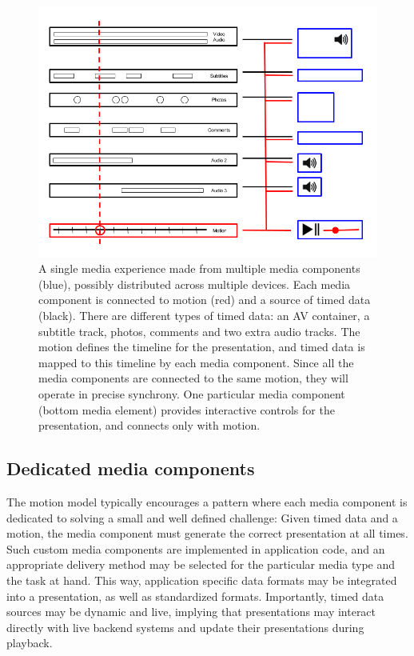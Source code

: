 \documentclass[graybox]{svmult}
\begin{document}
\begin{figure}[h]
\centering
\includegraphics[scale=.4]{fig/motion-media.png}
\caption{A single media experience made from multiple media components (blue), possibly distributed across multiple devices. Each media component is connected to motion (red) and a source of timed data (black). There are different types of timed data: an AV container, a subtitle track, photos, comments and two extra audio tracks. The motion defines the timeline for the presentation, and timed data is mapped to this timeline by each media component. Since all the media components are connected to the same motion, they will operate in precise synchrony. One particular media component (bottom media element) provides interactive controls for the presentation, and connects only with motion.}
\label{fig:motion-media}
\end{figure}


\subsection{Dedicated media components}

The motion model typically encourages a pattern where each media
component is dedicated to solving a small and well defined challenge: Given
timed data and a motion, the media component must generate the correct presentation at
all times. Such custom media components are implemented in application code,
and an appropriate delivery method may be selected for the particular media
type and the task at hand. This way, application specific data formats may be
integrated into a presentation, as well as standardized formats. Importantly,
timed data sources may be dynamic and live, implying that presentations may
interact directly with live backend systems and update their presentations
during playback.
\end{document}
